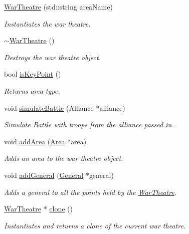 \begin{DoxyCompactItemize}
\item 
\mbox{\label{classWarTheatre_aa8bbedabf7a39a448d89cac0745ec0be}} 
\hyperlink{classWarTheatre_aa8bbedabf7a39a448d89cac0745ec0be}{War\+Theatre} (std\+::string area\+Name)
\begin{DoxyCompactList}\small\item\em Instantiates the war theatre. \end{DoxyCompactList}\item 
\hyperlink{classWarTheatre_a28324e2234a88933e1697c0f7f9ff222}{$\sim$\+War\+Theatre} ()
\begin{DoxyCompactList}\small\item\em Destroys the war theatre object. \end{DoxyCompactList}\item 
bool \hyperlink{classWarTheatre_a01845ca2cc01367101b2884f2902bf88}{is\+Key\+Point} ()
\begin{DoxyCompactList}\small\item\em Returns area type. \end{DoxyCompactList}\item 
void \hyperlink{classWarTheatre_a2b3a98ad63087ab1f858ecbb5651253d}{simulate\+Battle} (Alliance $\ast$alliance)
\begin{DoxyCompactList}\small\item\em Simulate Battle with troops from the alliance passed in. \end{DoxyCompactList}\item 
void \hyperlink{classWarTheatre_adc871336a6bf1263216b0f87da04cc57}{add\+Area} (\hyperlink{classArea}{Area} $\ast$area)
\begin{DoxyCompactList}\small\item\em Adds an area to the war theatre object. \end{DoxyCompactList}\item 
void \hyperlink{classWarTheatre_a1a8640cb110c90f2f2619344fc16a15e}{add\+General} (\hyperlink{classGeneral}{General} $\ast$general)
\begin{DoxyCompactList}\small\item\em Adds a general to all the points held by the \hyperlink{classWarTheatre}{War\+Theatre}. \end{DoxyCompactList}\item 
\hyperlink{classWarTheatre}{War\+Theatre} $\ast$ \hyperlink{classWarTheatre_afc32ceef9af26ba4e858c91bf769aef9}{clone} ()
\begin{DoxyCompactList}\small\item\em Instantiates and returns a clone of the current war theatre. \end{DoxyCompactList}\end{DoxyCompactItemize}


